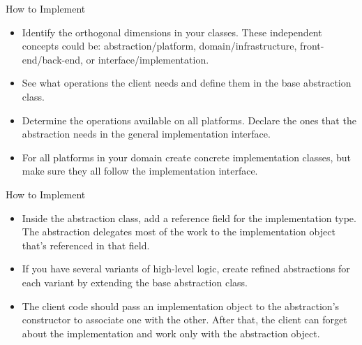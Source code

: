 \documentclass[13pt]{beamer}
\begin{document}
\begin{frame}{How to Implement}
	\begin{itemize}
		\item Identify the orthogonal dimensions in your classes. These independent concepts could be: abstraction/platform, domain/infrastructure, front-end/back-end, or interface/implementation.
		\item See what operations the client needs and define them in the base abstraction class.
		\item Determine the operations available on all platforms. Declare the ones that the abstraction needs in the general implementation interface.
		\item For all platforms in your domain create concrete implementation classes, but make sure they all follow the implementation interface.
	\end{itemize}
\end{frame}

\begin{frame}{How to Implement}
	\begin{itemize}
		\item Inside the abstraction class, add a reference field for the implementation type. The abstraction delegates most of the work to the implementation object that’s referenced in that field.
		\item If you have several variants of high-level logic, create refined abstractions for each variant by extending the base abstraction class.
		\item The client code should pass an implementation object to the abstraction’s constructor to associate one with the other. After that, the client can forget about the implementation and work only with the abstraction object.
	\end{itemize}
\end{frame}
\end{document}
